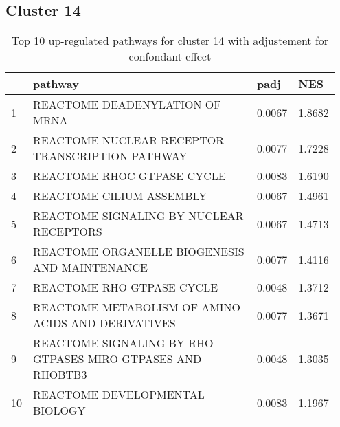 \documentclass{article}
\begin{document}
\subsection{Cluster 14 }
\begin{table}[H]
\centering
\begin{tabular}{p{0.05\linewidth}p{0.7\linewidth}p{0.1\linewidth}p{0.1\linewidth}}
  \hline
 & pathway & padj & NES \\ 
  \hline
1 & REACTOME DEADENYLATION OF MRNA & 0.0067 & 1.8682 \\ 
  2 & REACTOME NUCLEAR RECEPTOR TRANSCRIPTION PATHWAY & 0.0077 & 1.7228 \\ 
  3 & REACTOME RHOC GTPASE CYCLE & 0.0083 & 1.6190 \\ 
  4 & REACTOME CILIUM ASSEMBLY & 0.0067 & 1.4961 \\ 
  5 & REACTOME SIGNALING BY NUCLEAR RECEPTORS & 0.0067 & 1.4713 \\ 
  6 & REACTOME ORGANELLE BIOGENESIS AND MAINTENANCE & 0.0077 & 1.4116 \\ 
  7 & REACTOME RHO GTPASE CYCLE & 0.0048 & 1.3712 \\ 
  8 & REACTOME METABOLISM OF AMINO ACIDS AND DERIVATIVES & 0.0077 & 1.3671 \\ 
  9 & REACTOME SIGNALING BY RHO GTPASES MIRO GTPASES AND RHOBTB3 & 0.0048 & 1.3035 \\ 
  10 & REACTOME DEVELOPMENTAL BIOLOGY & 0.0083 & 1.1967 \\ 
   \hline
\end{tabular}
\caption{Top 10 up-regulated pathways for cluster 14 with adjustement for confondant effect} 
\label{tab:q3_2_conf_14}
\end{table}
\end{document}
